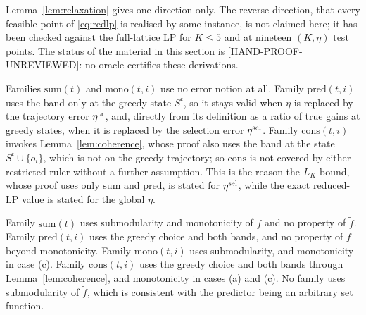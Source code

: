 \begin{remark}
\label{rem:status}
Lemma~\ref{lem:relaxation} gives one direction only. The reverse direction,
that every feasible point of \eqref{eq:redlp} is realised by some instance, is
not claimed here; it has been checked against the full-lattice LP for
$K \le 5$ and at nineteen $(K, \eta)$ test points. The status of the material in
this section is [HAND-PROOF-UNREVIEWED]: no oracle certifies these derivations.
\end{remark}

\begin{remark}
\label{rem:rulers}
Families $\mathrm{sum}(t)$ and $\mathrm{mono}(t,i)$ use no error notion at all.
Family $\mathrm{pred}(t,i)$ uses the band only at the greedy state $S^{t}$, so
it stays valid when $\eta$ is replaced by the trajectory error $\eta^{\mathrm{tr}}$, and,
directly from its definition as a ratio of true gains at greedy states, when it
is replaced by the selection error $\eta^{\mathrm{sel}}$. Family $\mathrm{cons}(t,i)$
invokes Lemma~\ref{lem:coherence}, whose proof also uses the band at the state
$S^{t} \cup \{o_{i}\}$, which is not on the greedy trajectory; so
$\mathrm{cons}$ is not covered by either restricted ruler without a further
assumption. This is the reason the $L_{K}$ bound, whose proof uses only
$\mathrm{sum}$ and $\mathrm{pred}$, is stated for $\eta^{\mathrm{sel}}$, while the exact
reduced-LP value is stated for the global $\eta$.
\end{remark}

\begin{remark}
\label{rem:census}
Family $\mathrm{sum}(t)$ uses submodularity and monotonicity of $f$ and no
property of $\tilde f$. Family $\mathrm{pred}(t,i)$ uses the greedy choice and
both bands, and no property of $f$ beyond monotonicity. Family
$\mathrm{mono}(t,i)$ uses submodularity, and monotonicity in case (c). Family
$\mathrm{cons}(t,i)$ uses the greedy choice and both bands through
Lemma~\ref{lem:coherence}, and monotonicity in cases (a) and (c). No family
uses submodularity of $\tilde f$, which is consistent with the predictor being
an arbitrary set function.
\end{remark}
